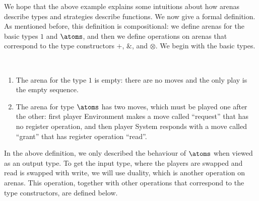 We hope that the above example explains some intuitions about how arenas describe types and strategies describe functions. We now give a formal definition. As mentioned before, this definition is compositional: we define arenas for the basic types $1$ and $\atoms$, and then we define operations on arenas that correspond to the type constructors  $+$, $\&$, and $\otimes$. We begin with the basic types.


\begin{definition}\label{def:arenas-without-atoms-or-functions} \ 
    \begin{enumerate}
        \item     The arena for the type $1$ is empty: there are no moves and the only play is the empty sequence. 
        \item The arena for type $\atoms$ has two moves, which must be played one after the other: first player Environment makes a move called ``request'' that has no register operation, and then player System responds with  a move called ``grant'' that has register operation ``read''.
    \end{enumerate}
\end{definition}

In the above definition, we only described the behaviour of $\atoms$ when viewed as an output type. To get the input type, where the players are swapped and read is swapped with write, we will use duality, which is another operation on arenas. This operation, together with other operations that correspond to the type constructors, are defined below.   

